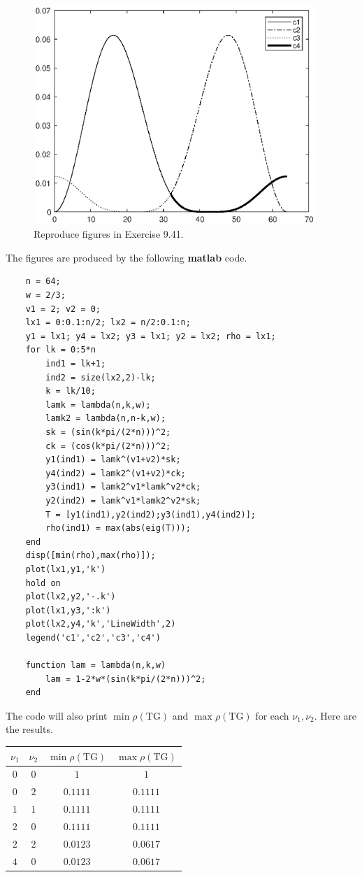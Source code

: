 \documentclass[twoside,a4paper]{article}
\begin{document}
\begin{figure}[H]
\begin{minipage}[t]{0.32\textwidth}
        \includegraphics[width=0.95\textwidth]{figure/ex9_41_40.eps}
        \caption*{$\nu_1=4,\nu_2=0$}
    \end{minipage}
    \caption{Reproduce figures in Exercise 9.41.}
\end{figure}

The figures are produced by the following \textbf{matlab} code.
\begin{lstlisting}
    n = 64;
    w = 2/3;
    v1 = 2; v2 = 0;
    lx1 = 0:0.1:n/2; lx2 = n/2:0.1:n;
    y1 = lx1; y4 = lx2; y3 = lx1; y2 = lx2; rho = lx1;
    for lk = 0:5*n
        ind1 = lk+1;
        ind2 = size(lx2,2)-lk;
        k = lk/10;
        lamk = lambda(n,k,w);
        lamk2 = lambda(n,n-k,w);
        sk = (sin(k*pi/(2*n)))^2;
        ck = (cos(k*pi/(2*n)))^2;
        y1(ind1) = lamk^(v1+v2)*sk;
        y4(ind2) = lamk2^(v1+v2)*ck;
        y3(ind1) = lamk2^v1*lamk^v2*ck;
        y2(ind2) = lamk^v1*lamk2^v2*sk;
        T = [y1(ind1),y2(ind2);y3(ind1),y4(ind2)];
        rho(ind1) = max(abs(eig(T)));
    end
    disp([min(rho),max(rho)]);
    plot(lx1,y1,'k')
    hold on
    plot(lx2,y2,'-.k')
    plot(lx1,y3,':k')
    plot(lx2,y4,'k','LineWidth',2)
    legend('c1','c2','c3','c4')

    function lam = lambda(n,k,w)
        lam = 1-2*w*(sin(k*pi/(2*n)))^2;
    end
\end{lstlisting}

The code will also print $\min\rho(\text{TG})$ and $\max\rho(\text{TG})$ for each $\nu_1,\nu_2$. Here are the results.
\begin{table}[H]
    \centering
    \begin{tabular}{cc|cc}
    $\nu_1$        & $\nu_2$         &        $\min\rho(\text{TG})$            &   $\max\rho(\text{TG})$ \\ \hline
    $0$ & $0$ & $1$ & $1$\\
    $0$ & $2$ & $0.1111$ & $0.1111$\\
    $1$ & $1$ & $0.1111$ & $0.1111$\\
    $2$ & $0$ & $0.1111$ & $0.1111$\\
    $2$ & $2$ & $0.0123$ & $0.0617$\\
    $4$ & $0$ & $0.0123$ & $0.0617$
   \end{tabular}
\end{table}
\end{document}
